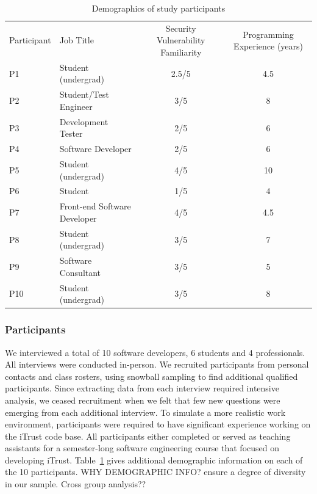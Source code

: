 \documentclass[conference]{IEEEtran}
\begin{document}
\begin{table}
\centering
\caption{Demographics of study participants}
\begin{tabular}{|l|l|c|c|}
\rowcolor{gray!50}
\hline
    Participant			& Job Title 						& Security Vulnerability Familiarity 					& Programming Experience (years) \\
    
    P1			    	& Student (undergrad)     			& 2.5/5												 	&  4.5    \\
    \hline
    P2			    	& Student/Test Engineer    			& 3/5									    			&  8 		\\
    \hline
    P3 					& Development Tester       			& 2/5													&  6 	    	\\
    \hline
    P4					& Software Developer     			& 2/5				 									&  6     	\\
    \hline
    P5					& Student (undergrad)      			& 4/5													&  10 	\\
    \hline
    P6					& Student		    				& 1/5							    					& 4		\\
    \hline
    P7					& Front-end Software Developer    	& 4/5													& 4.5              \\
    \hline
    P8					& Student (undergrad)	    		& 3/5													& 7   \\
    \hline
    P9					& Software Consultant   	 		& 3/5													& 5	  		 \\
    \hline
    P10			    	& Student (undergrad)    			& 3/5										 			& 8	              \\
    \hline
\end{tabular}
\label{table:participants}
\end{table}



\subsubsection{Participants}

We interviewed a total of 10 software developers, 6 students and 4 professionals. 
All interviews were conducted in-person.
We recruited participants from personal contacts and class rosters, using snowball sampling to find additional qualified participants.
Since extracting data from each interview required intensive analysis, we ceased recruitment when we felt that few new questions were emerging from each additional interview.
To simulate a more realistic work environment, participants were required to have significant experience working on the iTrust code base. All participants either completed or served as teaching assistants for a semester-long software engineering course that focused on developing iTrust.
Table~\ref{table:participants} gives additional demographic information on each of the 10 participants. 
WHY DEMOGRAPHIC INFO? ensure a degree of diversity in our sample. Cross group analysis??
\end{document}
